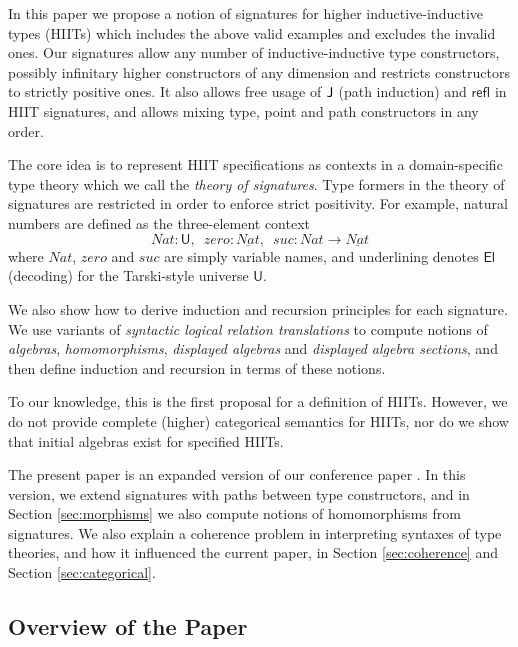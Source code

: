 \documentclass[dvipsnames]{lmcs} %
\newcommand{\U}{\mathsf{U}}
\newcommand{\El}{\mathsf{El}}
\newcommand{\ra}{\rightarrow}
\newcommand{\refl}{\mathsf{refl}}
\newcommand{\1}{\mathsf{1}} \renewcommand{\Pr}{\mathsf{Pr}}
\theoremstyle{plain}\newtheorem{satz}[thm]{Satz} %
\begin{document}
In this paper we propose a notion of signatures for higher inductive-inductive
types (HIITs) which includes the above valid examples and excludes the invalid
ones. Our signatures allow any number of inductive-inductive type constructors,
possibly infinitary higher constructors of any dimension and restricts
constructors to strictly positive ones. It also allows free usage of $\mathsf{J}$ (path
induction) and $\refl$ in HIIT signatures, and allows mixing type, point and path
constructors in any order.

The core idea is to represent HIIT specifications as contexts in a
domain-specific type theory which we call the \emph{theory of signatures}. Type
formers in the theory of signatures are restricted in order to enforce strict
positivity. For example, natural numbers are defined as the three-element
context
\[
  Nat:\U,\,\,\, zero:\underline{Nat},\,\,\, suc : Nat \ra \underline{Nat}
\]
where $Nat$, $zero$ and $suc$ are simply variable names, and underlining
denotes $\El$ (decoding) for the Tarski-style universe $\U$.

We also show how to derive induction and recursion principles for each
signature. We use variants of \emph{syntactic logical relation translations} to
compute notions of \emph{algebras}, \emph{homomorphisms}, \emph{displayed
  algebras} and \emph{displayed algebra sections}, and then define induction and
recursion in terms of these notions.

To our knowledge, this is the first proposal for a definition of
HIITs. However, we do not provide complete (higher) categorical semantics
for HIITs, nor do we show that initial algebras exist for specified HIITs.

The present paper is an expanded version of our conference paper \cite{hiit}.
In this version, we extend signatures with paths between type constructors, and
in Section \ref{sec:morphisms} we also compute notions of homomorphisms from
signatures. We also explain a coherence problem in interpreting syntaxes of type
theories, and how it influenced the current paper, in Section
\ref{sec:coherence} and Section \ref{sec:categorical}.

\subsection{Overview of the Paper}
\end{document}
